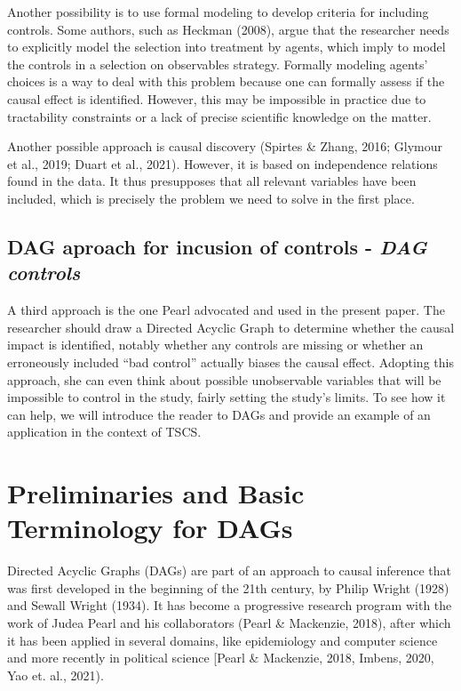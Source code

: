\documentclass[
  super,
  preprint,
  3p]{elsarticle}
\begin{document}
Another possibility is to use formal modeling to develop criteria for
including controls. Some authors, such as Heckman (2008), argue that the
researcher needs to explicitly model the selection into treatment by
agents, which imply to model the controls in a selection on observables
strategy. Formally modeling agents' choices is a way to deal with this
problem because one can formally assess if the causal effect is
identified. However, this may be impossible in practice due to
tractability constraints or a lack of precise scientific knowledge on
the matter.

Another possible approach is causal discovery (Spirtes \& Zhang, 2016;
Glymour et al., 2019; Duart et al., 2021). However, it is based on
independence relations found in the data. It thus presupposes that all
relevant variables have been included, which is precisely the problem we
need to solve in the first place.

\hypertarget{dag-aproach-for-incusion-of-controls---dag-controls}{%
\subsection{\texorpdfstring{DAG aproach for incusion of controls -
\emph{DAG
controls}}{DAG aproach for incusion of controls - DAG controls}}\label{dag-aproach-for-incusion-of-controls---dag-controls}}

A third approach is the one Pearl advocated and used in the present
paper. The researcher should draw a Directed Acyclic Graph to determine
whether the causal impact is identified, notably whether any controls
are missing or whether an erroneously included ``bad control'' actually
biases the causal effect. Adopting this approach, she can even think
about possible unobservable variables that will be impossible to control
in the study, fairly setting the study's limits. To see how it can help,
we will introduce the reader to DAGs and provide an example of an
application in the context of TSCS.

\hypertarget{preliminaries-and-basic-terminology-for-dags}{%
\section{Preliminaries and Basic Terminology for
DAGs}\label{preliminaries-and-basic-terminology-for-dags}}

Directed Acyclic Graphs (DAGs) are part of an approach to causal
inference that was first developed in the beginning of the 21th century,
by Philip Wright (1928) and Sewall Wright (1934). It has become a
progressive research program with the work of Judea Pearl and his
collaborators (Pearl \& Mackenzie, 2018), after which it has been
applied in several domains, like epidemiology and computer science and
more recently in political science {[}Pearl \& Mackenzie, 2018, Imbens,
2020, Yao et. al., 2021).
\end{document}
